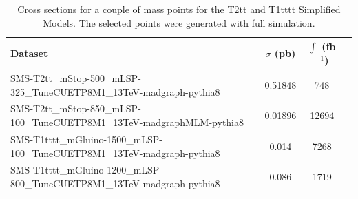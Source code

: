 \begin{table}[hp]
\centering
\caption{Cross sections for a couple of mass points for the T2tt and T1tttt 
Simplified Models. The selected points were generated with full simulation.} %
\label{tab:signalMC}
{\footnotesize
\begin{tabular}{lccc}
\hline \hline
Dataset & $\sigma$ (pb) & $\int$ (fb$^{-1}$) \\
\hline
SMS-T2tt\_mStop-500\_mLSP-325\_TuneCUETP8M1\_13TeV-madgraph-pythia8 & 0.51848 & 748 \\
SMS-T2tt\_mStop-850\_mLSP-100\_TuneCUETP8M1\_13TeV-madgraphMLM-pythia8 & 0.01896 & 12694 \\
\hline
SMS-T1tttt\_mGluino-1500\_mLSP-100\_TuneCUETP8M1\_13TeV-madgraph-pythia8 & 0.014 & 7268\\
SMS-T1tttt\_mGluino-1200\_mLSP-800\_TuneCUETP8M1\_13TeV-madgraph-pythia8 & 0.086 & 1719 \\
\hline \hline
\end{tabular}
\footnotesize}
\end{table}

